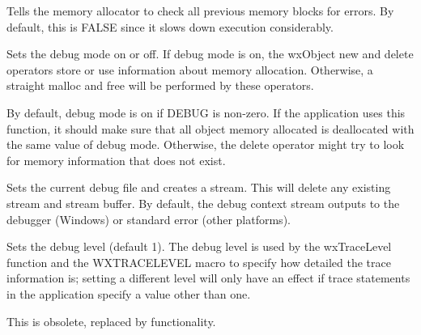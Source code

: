 
Tells the memory allocator to check all previous memory blocks for errors.
By default, this is FALSE since it slows down execution considerably.



\label{wxdebugcontextsetdebugmode}


Sets the debug mode on or off. If debug mode is on, the wxObject new and delete
operators store or use information about memory allocation. Otherwise,
a straight malloc and free will be performed by these operators.

By default, debug mode is on if DEBUG is non-zero. If the application
uses this function, it should make sure that all object memory allocated
is deallocated with the same value of debug mode. Otherwise, the
delete operator might try to look for memory information that does not
exist.



\label{wxdebugcontextsetfile}


Sets the current debug file and creates a stream. This will delete any existing
stream and stream buffer. By default, the debug context stream
outputs to the debugger (Windows) or standard error (other platforms).

\label{wxdebugcontextsetlevel}


Sets the debug level (default 1). The debug level is used by the wxTraceLevel function and
the WXTRACELEVEL macro to specify how detailed the trace information is; setting
a different level will only have an effect if trace statements in the application
specify a value other than one.

This is obsolete, replaced by  functionality.



